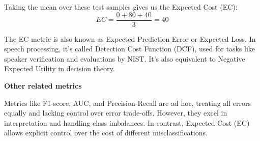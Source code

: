 Taking the mean over these test samples gives us the Expected Cost (EC):
\[
EC = \frac{0 + 80 + 40}{3} = 40
\]

{
    The EC metric is also known as Expected Prediction Error or Expected Loss. In speech processing, it’s called Detection Cost Function (DCF), used for tasks like speaker verification and evaluations by NIST. It's also equivalent to Negative Expected Utility in decision theory.
}

\textbf{Other related metrics}

Metrics like F1-score, AUC, and Precision-Recall are ad hoc, treating all errors equally and lacking control over error trade-offs. However, they excel in interpretation and handling class imbalances. In contrast, Expected Cost (EC) allows explicit control over the cost of different misclassifications.
